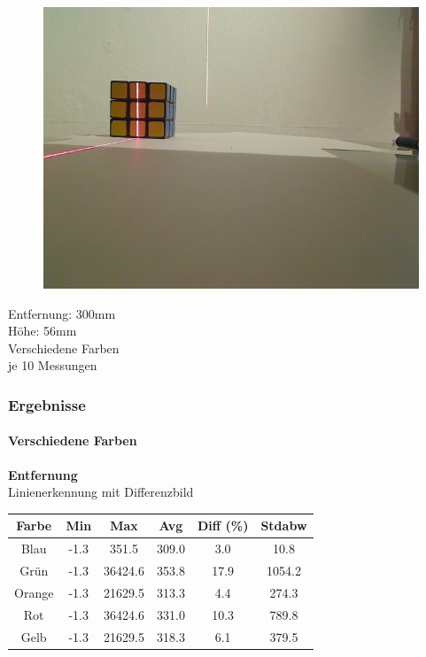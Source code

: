 \documentclass[xcolor=dvipsnames]{beamer}
\begin{document}
\begin{frame}
\begin{figure}
\begin{minipage}{0.32\linewidth}
		\end{minipage}
		\hfill
		\begin{minipage}{0.32\linewidth}
			\includegraphics[width=\linewidth]{includes/test_color_3}
		\end{minipage}
	\end{figure}
	
	Entfernung: 300mm\\
	Höhe: 56mm\\
	Verschiedene Farben\\
	je 10 Messungen
	
\end{frame}
	
\begin{frame}
	\frametitle{Ergebnisse}
	\framesubtitle{Verschiedene Farben}
		\textbf{Entfernung}\\
		
		Linienerkennung mit Differenzbild
		\begin{tabular}{c|c|c|c|c|c}
			Farbe & Min & Max & Avg & Diff (\%) & Stdabw\\ \hline
Blau &-1.3 & 351.5 & 309.0 & 3.0 & 10.8\\
Grün &-1.3 & 36424.6 & 353.8 & 17.9 & 1054.2\\
Orange &-1.3 & 21629.5 & 313.3 & 4.4 & 274.3\\
Rot &-1.3 & 36424.6 & 331.0 & 10.3 & 789.8\\
Gelb &-1.3 & 21629.5 & 318.3 & 6.1 & 379.5\\
		\end{tabular}
		
\end{frame}
\end{document}
